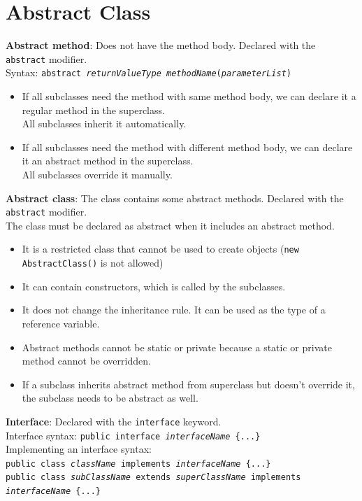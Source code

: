 \documentclass{article}
\begin{document}
\section{Abstract Class}
\textbf{Abstract method}: Does not have the method body. Declared with the \texttt{abstract} modifier.\\
Syntax: \texttt{abstract \textit{returnValueType} \textit{methodName}(\textit{parameterList})}
\begin{itemize}
	\item If all subclasses need the method with same method body, we can declare it a regular method in the superclass.\\
	All subclasses inherit it automatically.
	\item If all subclasses need the method with different method body, we can declare it an abstract method in the superclass.\\
	All subclasses override it manually.
\end{itemize}
\textbf{Abstract class}: The class contains some abstract methods. Declared with the \texttt{abstract} modifier.\\
The class must be declared as abstract when it includes an abstract method.
\begin{itemize}
	\item It is a restricted class that cannot be used to create objects (\texttt{new AbstractClass()} is not allowed)
	\item It can contain constructors, which is called by the subclasses.
	\item It does not change the inheritance rule. It can be used as the type of a reference variable.
	\item Abstract methods cannot be static or private because a static or private method cannot be overridden.
	\item If a subclass inherits abstract method from superclass but doesn't override it, the subclass needs to be abstract as well.
\end{itemize}
\textbf{Interface}: Declared with the \texttt{interface} keyword.\\
Interface syntax: \texttt{public interface \textit{interfaceName} \{...\}}\\
Implementing an interface syntax:\\
\texttt{public class \textit{className} implements \textit{interfaceName} \{...\}}\\
\texttt{public class \textit{subClassName} extends \textit{superClassName} implements \textit{interfaceName} \{...\}}
\end{document}
